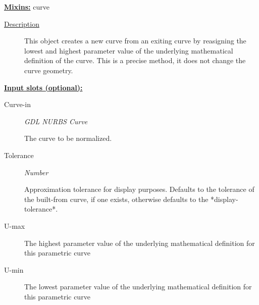 \documentclass [11pt]{book}
\begin{document}
\begin{itemize}
\textbf{
\underline{Mixins:}} curve





\begin{description}

\item [
\underline{Description}]


This object creates a new curve from an exiting 
curve by  reasigning the lowest and highest parameter value of the underlying 
mathematical definition of the curve. This is a precise method, it does not 
change the curve geometry.



\end{description}








\textbf{
\underline{Input slots (optional):}}

\begin{description}

\item [Curve-in]
\emph{GDL NURBS Curve}

 The curve to be normalized.




\item [Tolerance]
\emph{Number}

 Approximation tolerance for display purposes. Defaults to the tolerance of the
built-from curve, if one exists, otherwise defaults to the *display-tolerance*.




\item [U-max]

The highest parameter value of the underlying mathematical definition
for this parametric curve




\item [U-min]

The lowest parameter value of the underlying mathematical definition
for this parametric curve




\end{description}








\end{itemize}
\end{document}
